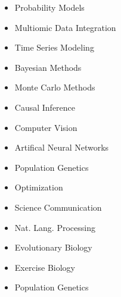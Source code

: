 \documentclass[11pt,margin,line]{resume}
\begin{document}
\begin{resume}
\vspace{-0.0mm}
\begin{multicols}{3}
    \begin{itemize}
    \setlength\itemsep{-0.2em}
         \item Probability Models
         \item Multiomic Data Integration
	\item Time Series Modeling
	\item Bayesian Methods
         \item Monte Carlo Methods
         \item Causal Inference
         \item Computer Vision
         \item Artifical Neural Networks
         \item Population Genetics
         \item Optimization
         \item Science Communication
         \item Nat. Lang. Processing
         \item Evolutionary Biology
         \item Exercise Biology
         \item Population Genetics
         
    \end{itemize}
    \end{multicols}\vspace{-4.5mm}


\end{resume}
\end{document}
